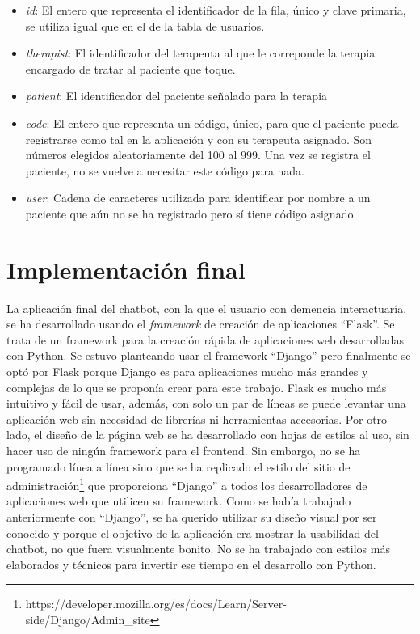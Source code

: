 \begin{itemize}
	\item \textit{id}: El entero que representa el identificador de la fila, único y clave primaria, se utiliza igual que en el de la tabla de usuarios.
	\item \textit{therapist}: El identificador del terapeuta al que le correponde la terapia  encargado de tratar al paciente que toque.
	\item \textit{patient}: El identificador del paciente señalado para la terapia
	\item \textit{code}: El entero que representa un código, único, para que el paciente pueda registrarse como tal en la aplicación y con su terapeuta asignado. Son números elegidos aleatoriamente del 100 al 999. Una vez se registra el paciente, no se vuelve a necesitar este código para nada.
	\item \textit{user}: Cadena de caracteres utilizada para identificar por nombre a un paciente que aún no se ha registrado pero sí tiene código asignado.
\end{itemize}


\section{Implementación final}

La aplicación final del chatbot, con la que el usuario con demencia interactuaría, se ha desarrollado usando el \textit{framework} de creación de aplicaciones ``Flask''. Se trata de un framework para la creación rápida de aplicaciones web desarrolladas con Python. Se estuvo planteando usar el framework ``Django'' pero finalmente se optó por Flask porque Django es para aplicaciones mucho más grandes y complejas de lo que se proponía crear para este trabajo. Flask es mucho más intuitivo y fácil de usar, además, con solo un par de líneas se puede levantar una aplicación web sin necesidad de librerías ni herramientas accesorias. Por otro lado, el diseño de la página web se ha desarrollado con hojas de estilos al uso, sin hacer uso de ningún framework para el frontend. Sin embargo, no se ha programado línea a línea sino que se ha replicado el estilo del sitio de administración\footnote{https://developer.mozilla.org/es/docs/Learn/Server-side/Django/Admin\_site} que proporciona ``Django'' a todos los desarrolladores de aplicaciones web que utilicen su framework. Como se había trabajado anteriormente con ``Django'', se ha querido utilizar su diseño visual por ser conocido y porque el objetivo de la aplicación era mostrar la usabilidad del chatbot, no que fuera visualmente bonito. No se ha trabajado con estilos más elaborados y técnicos para invertir ese tiempo en el desarrollo con Python.

